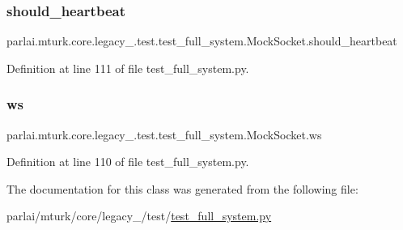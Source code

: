 \subsubsection{\texorpdfstring{should\+\_\+heartbeat}{should\_heartbeat}}
{\footnotesize\ttfamily parlai.\+mturk.\+core.\+legacy\+\_.\+test.\+test\+\_\+full\+\_\+system.\+Mock\+Socket.\+should\+\_\+heartbeat}



Definition at line 111 of file test\+\_\+full\+\_\+system.\+py.

\mbox{\label{classparlai_1_1mturk_1_1core_1_1legacy__2018_1_1test_1_1test__full__system_1_1MockSocket_a4880b2d86e4a803c00b8a3b1b9b83eeb}} 
\subsubsection{\texorpdfstring{ws}{ws}}
{\footnotesize\ttfamily parlai.\+mturk.\+core.\+legacy\+\_.\+test.\+test\+\_\+full\+\_\+system.\+Mock\+Socket.\+ws}



Definition at line 110 of file test\+\_\+full\+\_\+system.\+py.



The documentation for this class was generated from the following file\+:\begin{DoxyCompactItemize}
\item 
parlai/mturk/core/legacy\+\_/test/\hyperlink{legacy__2018_2test_2test__full__system_8py}{test\+\_\+full\+\_\+system.\+py}\end{DoxyCompactItemize}
